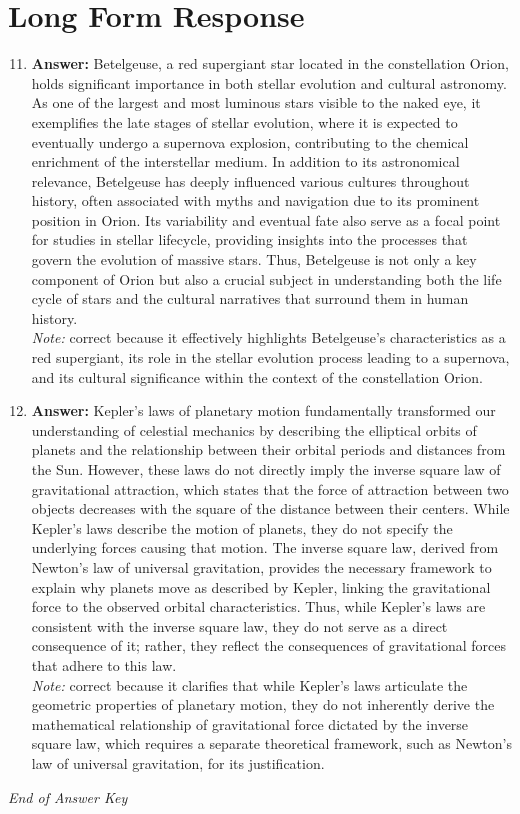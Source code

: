 \documentclass[12pt]{article}
\begin{document}
\section*{Long Form Response}
\begin{enumerate}[label=\arabic*.]
\setcounter{enumi}{10}
\item \textbf{Answer:} Betelgeuse, a red supergiant star located in the constellation Orion, holds significant importance in both stellar evolution and cultural astronomy. As one of the largest and most luminous stars visible to the naked eye, it exemplifies the late stages of stellar evolution, where it is expected to eventually undergo a supernova explosion, contributing to the chemical enrichment of the interstellar medium. In addition to its astronomical relevance, Betelgeuse has deeply influenced various cultures throughout history, often associated with myths and navigation due to its prominent position in Orion. Its variability and eventual fate also serve as a focal point for studies in stellar lifecycle, providing insights into the processes that govern the evolution of massive stars. Thus, Betelgeuse is not only a key component of Orion but also a crucial subject in understanding both the life cycle of stars and the cultural narratives that surround them in human history.
\\ \textit{Note:} correct because it effectively highlights Betelgeuse's characteristics as a red supergiant, its role in the stellar evolution process leading to a supernova, and its cultural significance within the context of the constellation Orion.
\item \textbf{Answer:} Kepler's laws of planetary motion fundamentally transformed our understanding of celestial mechanics by describing the elliptical orbits of planets and the relationship between their orbital periods and distances from the Sun. However, these laws do not directly imply the inverse square law of gravitational attraction, which states that the force of attraction between two objects decreases with the square of the distance between their centers. While Kepler's laws describe the motion of planets, they do not specify the underlying forces causing that motion. The inverse square law, derived from Newton's law of universal gravitation, provides the necessary framework to explain why planets move as described by Kepler, linking the gravitational force to the observed orbital characteristics. Thus, while Kepler's laws are consistent with the inverse square law, they do not serve as a direct consequence of it; rather, they reflect the consequences of gravitational forces that adhere to this law.
\\ \textit{Note:} correct because it clarifies that while Kepler's laws articulate the geometric properties of planetary motion, they do not inherently derive the mathematical relationship of gravitational force dictated by the inverse square law, which requires a separate theoretical framework, such as Newton's law of universal gravitation, for its justification.
\end{enumerate}

\vfill
\noindent\textit{End of Answer Key}
\end{document}
